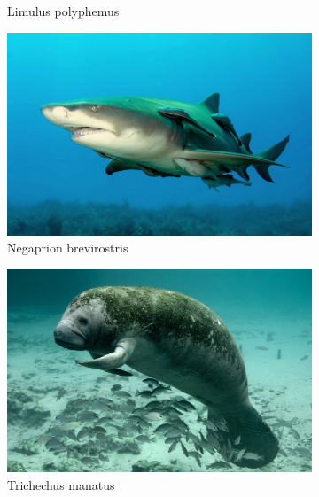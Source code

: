 \documentclass[10pt]{article}
\begin{document}
\begin{figure}[h]
\begin{subfigure}[b]{0.48\textwidth}
         \caption{Limulus polyphemus}
     \end{subfigure}
     \hfill
     \begin{subfigure}[b]{0.48\textwidth}
         \centering
         \includegraphics[width=\textwidth]{images/negaprion_brevirostris.jpg}
         \caption{Negaprion brevirostris}
     \end{subfigure}
     \hfill
     \begin{subfigure}[b]{0.48\textwidth}
         \centering
         \includegraphics[width=\textwidth]{images/trichechus_manatus.jpg}
         \caption{Trichechus manatus}
     \end{subfigure}
     \hfill
     \begin{subfigure}[b]{0.48\textwidth}
         \centering

\end{subfigure}
\end{figure}
\end{document}
